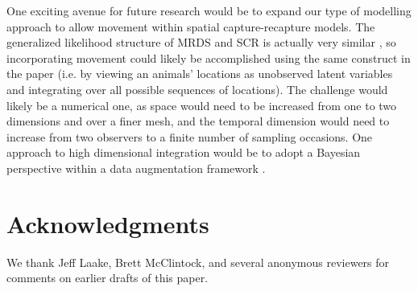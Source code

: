 \documentclass[aoas,preprint]{imsart}
\numberwithin{equation}{section}
\theoremstyle{plain}
\begin{document}
One exciting avenue for future research would be to expand our type of modelling approach to allow movement within spatial capture-recapture \citep[SCR; e.g.][]{BorchersEfford2008,RoyleEtAl2013book} models.  The generalized likelihood structure of MRDS and SCR is actually very similar \citep{BorchersEtAl2015,BorchersMarques2017}, so incorporating movement could likely be accomplished using the same construct in the paper (i.e. by viewing an animals' locations as unobserved latent variables and integrating over all possible sequences of locations).  The challenge would likely be a numerical one, as space would need to be increased from one to two dimensions and over a finer mesh, and the temporal dimension would need to increase from two observers to a finite number of sampling occasions.  One approach to high dimensional integration would be to adopt a Bayesian perspective within a data augmentation framework \citep{RoyleEtAl2007b,ConnEtAl2012}.

\section*{Acknowledgments}
We thank Jeff Laake, Brett McClintock, and several anonymous reviewers for comments on earlier drafts of this paper.



\end{document}
